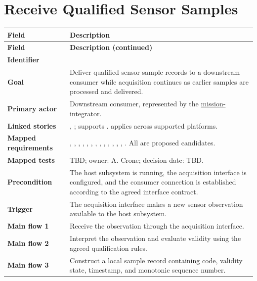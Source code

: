 \section{Receive Qualified Sensor Samples}

\begin{tabularx}{\linewidth}{L{3.5cm}Y}
\caption{Receive Qualified Sensor Samples\label{Table:UC004}}\\
\toprule
\textbf{Field} & \textbf{Description}\\\midrule\endfirsthead
\textbf{Field} & \textbf{Description (continued)}\\\midrule\endhead
\bottomrule\endlastfoot
\textbf{Identifier} & \\
\textbf{Goal} & Deliver qualified sensor sample records to a downstream consumer while acquisition continues as earlier samples are processed and delivered.\\
\textbf{Primary actor} & Downstream consumer, represented by the \hyperref[Stakeholder:MissionIntegrator]{mission-integrator}.\\
\textbf{Linked stories} & , ; supports .  applies across supported platforms.\\
\textbf{Mapped requirements} & , , , , , , , , , , , , , . All are proposed candidates.\\
\textbf{Mapped tests} & TBD; owner: A. Crone; decision date: TBD.\\
\textbf{Precondition} & The host subsystem is running, the acquisition interface is configured, and the consumer connection is established according to the agreed interface contract.\\
\textbf{Trigger} & The acquisition interface makes a new sensor observation available to the host subsystem.\\
\textbf{Main flow 1} & Receive the observation through the acquisition interface.\\
\textbf{Main flow 2} & Interpret the observation and evaluate validity using the agreed qualification rules.\\
\textbf{Main flow 3} & Construct a local sample record containing code, validity state, timestamp, and monotonic sequence number.\\

\end{tabularx}
